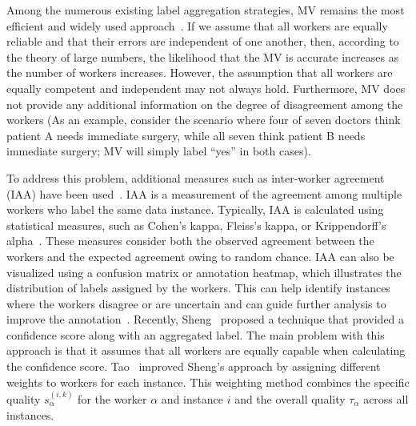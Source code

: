 Among the numerous existing label aggregation strategies, MV remains the most efficient and widely used approach~\cite{tao_Label_2020}. If we assume that all workers are equally reliable and that their errors are independent of one another, then, according to the theory of large numbers, the likelihood that the MV is accurate increases as the number of workers increases. However, the assumption that all workers are equally competent and independent may not always hold. Furthermore, MV does not provide any additional information on the degree of disagreement among the workers (As an example, consider the scenario where four of seven doctors think patient A needs immediate surgery, while all seven think patient B needs immediate surgery; MV will simply label ``yes'' in both cases).

To address this problem, additional measures such as inter-worker agreement (IAA) have been used~\cite{artstein_InterAnnotator_2017}. IAA is a measurement of the agreement among multiple workers who label the same data instance. Typically, IAA is calculated using statistical measures, such as Cohen's kappa, Fleiss's kappa, or Krippendorff's alpha~\cite{krippendorff_Content_2018}. These measures consider both the observed agreement between the workers and the expected agreement owing to random chance. IAA can also be visualized using a confusion matrix or annotation heatmap, which illustrates the distribution of labels assigned by the workers. This can help identify instances where the workers disagree or are uncertain and can guide further analysis to improve the annotation~\cite{carletta_Assessing_1996}.
Recently, Sheng~\cite{sheng_Majority_2019} proposed a technique that provided a confidence score along with an aggregated label. The main problem with this approach is that it assumes that all workers are equally capable when calculating the confidence score. Tao~\cite{tao_Label_2020} improved Sheng's approach by assigning different weights to workers for each instance. This weighting method combines the specific quality $s_\alpha^{(i,k)} $ for the worker $\alpha $ and instance $i $ and the overall quality $\tau_\alpha$ across all instances.

